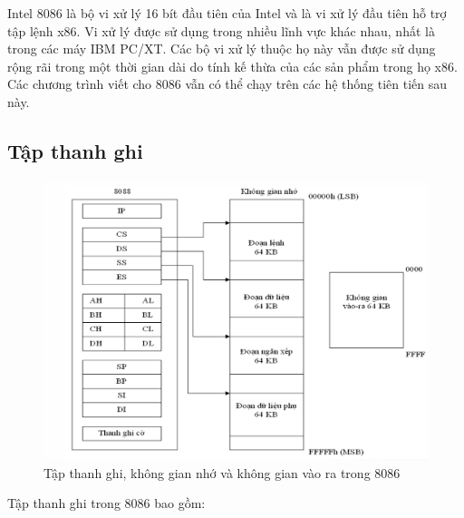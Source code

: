 \documentclass[../report.tex]{subfiles}
\begin{document}
Intel 8086 là bộ vi xử lý 16 bít đầu tiên của Intel và là vi xử lý đầu tiên hỗ trợ tập lệnh
x86. Vi xử lý được sử dụng trong nhiều lĩnh vực khác nhau, nhất là trong các máy IBM PC/XT. Các bộ vi xử lý thuộc họ này vẫn được sử dụng rộng rãi trong một thời gian dài do tính kế thừa của các sản phẩm trong họ x86. Các chương trình viết cho 8086 vẫn có thể chạy
trên các hệ thống tiên tiến sau này.

\subsection{Tập thanh ghi}
\begin{figure}[H]
    \centering
    \includegraphics[width=\textwidth]{figures/sw.png}
    \caption{Tập thanh ghi, không gian nhớ và không gian vào ra trong 8086}
\end{figure}
Tập thanh ghi trong 8086 bao gồm:
\end{document}
